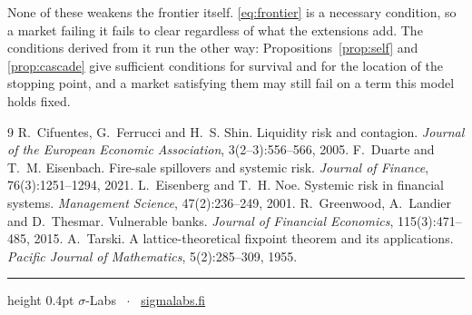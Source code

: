 \documentclass[11pt,a4paper]{article}
\theoremstyle{plain}
\theoremstyle{definition}
\theoremstyle{remark}
\begin{document}
None of these weakens the frontier itself. \eqref{eq:frontier} is a necessary condition, so a market
failing it fails to clear regardless of what the extensions add. The conditions derived from it run
the other way: Propositions~\ref{prop:self} and \ref{prop:cascade} give sufficient conditions for
survival and for the location of the stopping point, and a market satisfying them may still fail
on a term this model holds fixed.

\begin{thebibliography}{9}
 R.~Cifuentes, G.~Ferrucci and H.~S. Shin.
  Liquidity risk and contagion. \emph{Journal of the European Economic Association}, 3(2--3):556--566, 2005.
 F.~Duarte and T.~M. Eisenbach.
  Fire-sale spillovers and systemic risk. \emph{Journal of Finance}, 76(3):1251--1294, 2021.
 L.~Eisenberg and T.~H. Noe.
  Systemic risk in financial systems. \emph{Management Science}, 47(2):236--249, 2001.
 R.~Greenwood, A.~Landier and D.~Thesmar.
  Vulnerable banks. \emph{Journal of Financial Economics}, 115(3):471--485, 2015.
 A.~Tarski.
  A lattice-theoretical fixpoint theorem and its applications.
  \emph{Pacific Journal of Mathematics}, 5(2):285--309, 1955.
\end{thebibliography}

\vspace{2em}
\hrule height 0.4pt
\vspace{0.8em}
{\footnotesize\noindent $\sigma$-Labs \ $\cdot$ \ \href{https://www.sigmalabs.fi}{sigmalabs.fi}}
\end{document}
